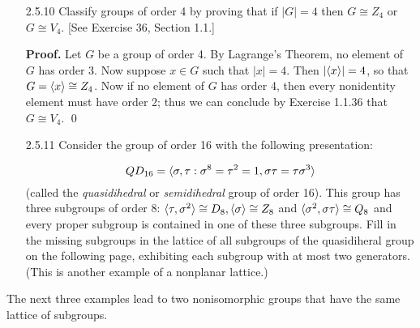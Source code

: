\begin{enumerate}
                  (a) $\Z/16\Z$ \qquad (b) $\Z/24\Z$ \qquad
                  (c) $\Z/48\Z$. [See Exercise 6 in Section 3.]

      \textbf{Solution. TODO. TikZ} 
   \item[2.5.10]  Classify groups of order 4 by proving that if $|G| = 4$ then
                  $G \cong Z_4$ or $G\cong V_4$. [See Exercise 36, Section 1.1.]

      \textbf{Proof.} Let $G$ be a group of order 4. By Lagrange's Theorem, no 
      element of $G$ has order 3. Now suppose $x \in G$ such that $|x| = 4$.
      Then $|\langle x \rangle| = 4$, so that $G = \langle x \rangle \cong Z_4$. Now if no element
      of $G$ has order 4, then every nonidentity element must have order 2;
      thus we can conclude by Exercise 1.1.36 that $G \cong V_4$. \qed
   \item[2.5.11]  Consider the group of order 16 with the following
                  presentation:

                  $$QD_{16} = \langle \sigma, \tau : \sigma^8 = \tau^2 = 1,
                    \sigma\tau = \tau\sigma^3 \rangle$$
                  (called the \textit{quasidihedral} or \textit{semidihedral}
                  group of order 16). This group has three subgroups of order 8:
                  $\langle \tau, \sigma^2 \rangle \cong D_8, \langle \sigma \rangle \cong Z_8$ and
                  $\langle \sigma^2, \sigma\tau \rangle \cong Q_8$ and every proper
                  subgroup is contained in one of these three subgroups. Fill in
                  the missing subgroups in the lattice of all subgroups of the 
                  quasidiheral group on the following page, exhibiting each
                  subgroup with at most two generators. (This is another example
                  of a nonplanar lattice.)
\end{enumerate}

\noindent The next three examples lead to two nonisomorphic groups that have the 
          same lattice of subgroups.

